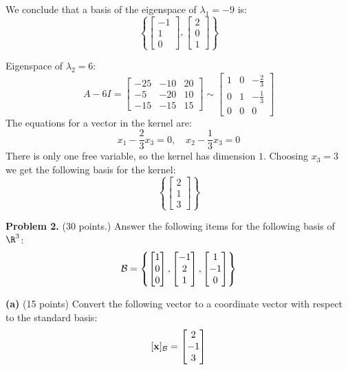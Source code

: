 \documentclass[12pt]{article}
\begin{document}
We conclude that a basis of the eigenspace of $\lambda_1=-9$ is:
\[
\left\{
\begin{bmatrix}-1\\1\\0\end{bmatrix},
\begin{bmatrix}2\\0\\1\end{bmatrix}
\right\}
\]

Eigenspace of $\lambda_2=6$:
\[
A-6I=
\left[\begin{matrix}-25 & -10 & 20\\-5 & -20 & 10\\-15 & -15 & 15\end{matrix}\right]\sim
\left[\begin{matrix}1 & 0 & - \frac{2}{3}\\0 & 1 & - \frac{1}{3}\\0 & 0 & 0\end{matrix}\right]
\]
The equations for a vector in the kernel are:
\[
x_1-\frac{2}{3}x_3=0,\quad x_2-\frac{1}{3}x_3=0
\]
There is only one free variable, so the kernel has dimension $1$. Choosing $x_3=3$ we get the following basis for the kernel:
\[
\left\{
\begin{bmatrix}2\\1\\3\end{bmatrix}
\right\}
\]
\proofend

\textbf{Problem 2.} (30 points.) Answer the following items for the following basis of $\R^{3}$:
\[
{\cal B}=\left\{
\begin{bmatrix} 1\\ 0\\ 0\end{bmatrix},
\begin{bmatrix} -1\\ 2\\ 1\end{bmatrix},
\begin{bmatrix} 1\\ -1\\ 0\end{bmatrix}
\right\}
\]

\textbf{(a)} (15 points) Convert the following vector to a coordinate vector with respect to the standard basis: 
\[
[\mathbf{x}]_{\cal B}=\begin{bmatrix}2\\-1\\3\end{bmatrix}
\]
\end{document}
